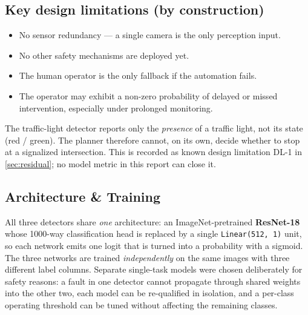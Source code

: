 \documentclass[a4paper,12pt]{article}
\begin{document}
\subsection{Key design limitations (by construction)}

{\small
\begin{itemize}[itemsep=1pt,topsep=2pt]
  \item No sensor redundancy --- a single camera is the only perception input.
  \item No other safety mechanisms are deployed yet.
  \item The human operator is the only fallback if the automation fails.
  \item The operator may exhibit a non-zero probability of delayed or missed intervention, especially under prolonged monitoring.
\end{itemize}}

The traffic-light detector reports only the \emph{presence} of a traffic light, not its
state (red / green). The planner therefore cannot, on its own, decide whether to stop at
a signalized intersection. This is recorded as known design limitation DL-1 in
\cref{sec:residual}; no model metric in this report can close it.


\subsection{Architecture \& Training}
\label{sec:arch}

All three detectors share \emph{one} architecture: an ImageNet-pre\-trained
\textbf{ResNet-18} whose 1000-way classification head is replaced by a single
\texttt{Linear(512,\,1)} unit, so each network emits one logit that is turned into a
probability with a sigmoid. The three networks are trained \emph{independently} on the same
images with three different label columns. Separate single-task models were chosen
deliberately for safety reasons: a fault in one detector cannot propagate through shared
weights into the other two, each model can be re-qualified in isolation, and a per-class
operating threshold can be tuned without affecting the remaining classes.
\end{document}

